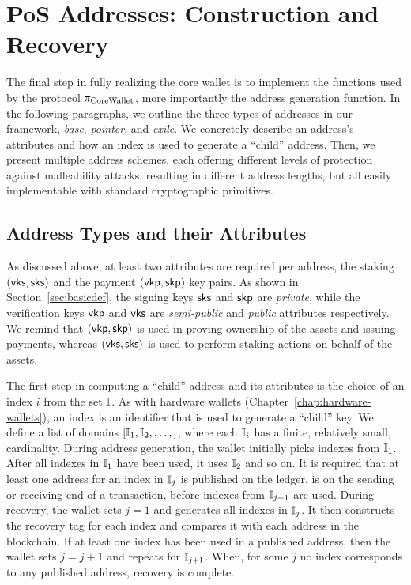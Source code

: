 \section{PoS Addresses: Construction and Recovery}\label{sec:address}

The final step in fully realizing the core wallet is to implement the functions
used by the protocol $\pi_\mathrm{CoreWallet}$, more importantly the address generation
function. In the following paragraphs, we outline the three types of addresses
in our framework, \ie \emph{base}, \emph{pointer}, and \emph{exile}. We
concretely describe an address's attributes and how an index is used to
generate a ``child'' address. Then, we present multiple address schemes, each
offering different levels of protection against malleability attacks, resulting
in different address lengths, but all easily implementable with standard
cryptographic primitives.

\subsection{Address Types and their Attributes}\label{subsec:address-attributes}

As discussed above, at least two attributes are required per address, \ie the
staking $(\mathsf{vks}, \mathsf{sks})$ and the payment $(\mathsf{vkp}, \mathsf{skp})$ key pairs. As shown
in Section~\ref{sec:basicdef}, the signing keys $\mathsf{sks}$ and
$\mathsf{skp}$ are \emph{private}, while the verification keys
$\mathsf{vkp}$ and $\mathsf{vks}$ are \emph{semi-public} and
\emph{public} attributes respectively. We remind that $(\mathsf{vkp}, \mathsf{skp})$ is used
in proving ownership of the assets and issuing payments, whereas
$(\mathsf{vks}, \mathsf{sks})$ is used to perform staking actions on behalf of the assets.

The first step in computing a ``child'' address and its attributes is the
choice of an index $i$ from the set $\mathbb{I}$. As with hardware wallets
(Chapter~\ref{chap:hardware-wallets}), an index is an identifier that is used
to generate a ``child'' key. We define a list of domains $[ \mathbb{I}_1,
\mathbb{I}_2, \ldots, ]$, where each $\mathbb{I}_i$ has a finite, relatively
small, cardinality. During address generation, the wallet initially picks
indexes from $\mathbb{I}_1$. After all indexes in $\mathbb{I}_1$ have been
used, it uses $\mathbb{I}_2$ and so on. It is required that at least one
address for an index in $\mathbb{I}_j$ is published on the ledger, \ie is on
the sending or receiving end of a transaction, before indexes from
$\mathbb{I}_{j+1}$ are used. During recovery, the wallet sets $j = 1$ and
generates all indexes in $\mathbb{I}_j$. It then constructs the recovery tag
for each index and compares it with each address in the blockchain. If at least
one index has been used in a published address, then the wallet sets $j = j +
1$ and repeats for $\mathbb{I}_{j+1}$. When, for some $j$ no index corresponds
to any published address, recovery is complete.

